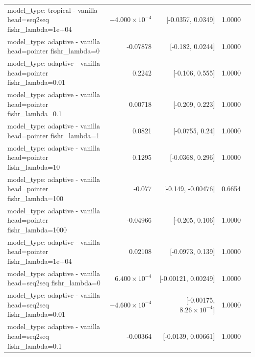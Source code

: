 \documentclass[10pt]{article}
\makeatletter
\newcommand{\stackcell}[1]{\begin{tabular}[t]{@{}l@{}}#1\end{tabular}}
\makeatother
\begin{document}
{\begin{longtable}{lrrrl}
\stackcell{model\_type: tropical - vanilla\\\footnotesize head=seq2seq fishr\_lambda=1e+04 } & $-4.000\times10^{-4}$ & [-0.0357, 0.0349] & 1.0000 & \\
\stackcell{model\_type: adaptive - vanilla\\\footnotesize head=pointer fishr\_lambda=0 } & -0.07878 & [-0.182, 0.0244] & 1.0000 & \\
\stackcell{model\_type: adaptive - vanilla\\\footnotesize head=pointer fishr\_lambda=0.01 } & 0.2242 & [-0.106, 0.555] & 1.0000 & \\
\stackcell{model\_type: adaptive - vanilla\\\footnotesize head=pointer fishr\_lambda=0.1 } & 0.00718 & [-0.209, 0.223] & 1.0000 & \\
\stackcell{model\_type: adaptive - vanilla\\\footnotesize head=pointer fishr\_lambda=1 } & 0.0821 & [-0.0755, 0.24] & 1.0000 & \\
\stackcell{model\_type: adaptive - vanilla\\\footnotesize head=pointer fishr\_lambda=10 } & 0.1295 & [-0.0368, 0.296] & 1.0000 & \\
\stackcell{model\_type: adaptive - vanilla\\\footnotesize head=pointer fishr\_lambda=100 } & -0.077 & [-0.149, -0.00476] & 0.6654 & \\
\stackcell{model\_type: adaptive - vanilla\\\footnotesize head=pointer fishr\_lambda=1000 } & -0.04966 & [-0.205, 0.106] & 1.0000 & \\
\stackcell{model\_type: adaptive - vanilla\\\footnotesize head=pointer fishr\_lambda=1e+04 } & 0.02108 & [-0.0973, 0.139] & 1.0000 & \\
\stackcell{model\_type: adaptive - vanilla\\\footnotesize head=seq2seq fishr\_lambda=0 } & $6.400\times10^{-4}$ & [-0.00121, 0.00249] & 1.0000 & \\
\stackcell{model\_type: adaptive - vanilla\\\footnotesize head=seq2seq fishr\_lambda=0.01 } & $-4.600\times10^{-4}$ & [-0.00175, $8.26\times10^{-4}$] & 1.0000 & \\
\stackcell{model\_type: adaptive - vanilla\\\footnotesize head=seq2seq fishr\_lambda=0.1 } & -0.00364 & [-0.0139, 0.00661] & 1.0000 & \\

\end{longtable}}
\end{document}

